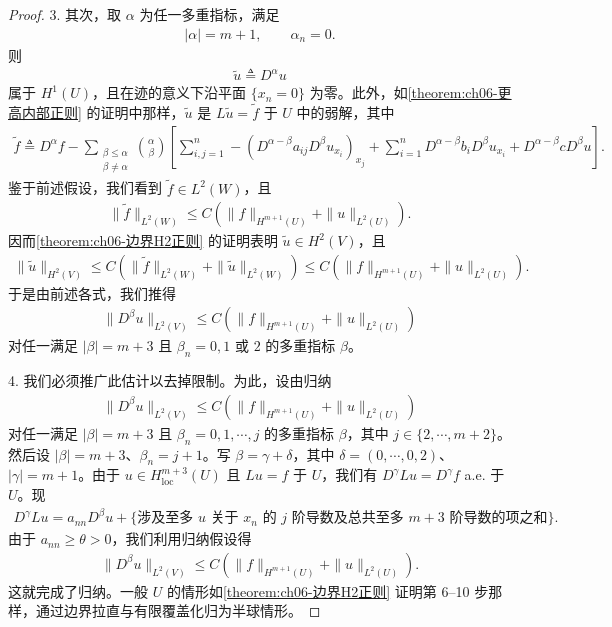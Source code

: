 \documentclass[../../main.tex]{subfiles}
\begin{document}
\begin{proof}
3. 其次，取 $\alpha$ 为任一多重指标，满足
\begin{align}
|\alpha|=m+1,\qquad \alpha_{n}=0.
\end{align}
则
\begin{align}
\widetilde{u}\triangleq D^{\alpha}u
\end{align}
属于 $H^{1}(U)$，且在迹的意义下沿平面 $\{x_{n}=0\}$ 为零。此外，如\cref{theorem:ch06-更高内部正则} 的证明中那样，$\widetilde{u}$ 是 $L\widetilde{u}=\widetilde{f}$ 于 $U$ 中的弱解，其中
\begin{align*}
\widetilde{f}\triangleq D^{\alpha}f-\sum_{\substack{\beta\leqslant\alpha\\ \beta\neq\alpha}}\binom{\alpha}{\beta}\left[\sum_{i,j=1}^{n}-(D^{\alpha-\beta}a_{ij}D^{\beta}u_{x_{i}})_{x_{j}}+\sum_{i=1}^{n}D^{\alpha-\beta}b_{i}D^{\beta}u_{x_{i}}+D^{\alpha-\beta}cD^{\beta}u\right].
\end{align*}
鉴于前述假设，我们看到 $\widetilde{f}\in L^{2}(W)$，且
\begin{align}
\|\widetilde{f}\|_{L^{2}(W)}\leqslant C(\|f\|_{H^{m+1}(U)}+\|u\|_{L^{2}(U)}).
\end{align}
因而\cref{theorem:ch06-边界H2正则} 的证明表明 $\widetilde{u}\in H^{2}(V)$，且
\begin{align*}
\|\widetilde{u}\|_{H^{2}(V)}
\leqslant C(\|\widetilde{f}\|_{L^{2}(W)}+\|\widetilde{u}\|_{L^{2}(W)})
\leqslant C(\|f\|_{H^{m+1}(U)}+\|u\|_{L^{2}(U)}).
\end{align*}
于是由前述各式，我们推得
\begin{align}
\|D^{\beta}u\|_{L^{2}(V)}\leqslant C(\|f\|_{H^{m+1}(U)}+\|u\|_{L^{2}(U)})
\end{align}
对任一满足 $|\beta|=m+3$ 且 $\beta_{n}=0,1$ 或 $2$ 的多重指标 $\beta$。

4. 我们必须推广此估计以去掉限制。为此，设由归纳
\begin{align}
\|D^{\beta}u\|_{L^{2}(V)}\leqslant C(\|f\|_{H^{m+1}(U)}+\|u\|_{L^{2}(U)})
\end{align}
对任一满足 $|\beta|=m+3$ 且 $\beta_{n}=0,1,\cdots,j$ 的多重指标 $\beta$，其中 $j\in\{2,\cdots,m+2\}$。然后设 $|\beta|=m+3$、$\beta_{n}=j+1$。写 $\beta=\gamma+\delta$，其中 $\delta=(0,\cdots,0,2)$、$|\gamma|=m+1$。由于 $u\in H^{m+3}_{\mathrm{loc}}(U)$ 且 $Lu=f$ 于 $U$，我们有 $D^{\gamma}Lu=D^{\gamma}f$ a.e. 于 $U$。现
\begin{align*}
D^{\gamma}Lu=a_{nn}D^{\beta}u+\{\text{涉及至多 }u\text{ 关于 }x_{n}\text{ 的 }j\text{ 阶导数及总共至多 }m+3\text{ 阶导数的项之和}\}.
\end{align*}
由于 $a_{nn}\geqslant\theta>0$，我们利用归纳假设得
\begin{align}
\|D^{\beta}u\|_{L^{2}(V)}\leqslant C(\|f\|_{H^{m+1}(U)}+\|u\|_{L^{2}(U)}).
\end{align}
这就完成了归纳。一般 $U$ 的情形如\cref{theorem:ch06-边界H2正则} 证明第 6--10 步那样，通过边界拉直与有限覆盖化归为半球情形。
\end{proof}
\end{document}
